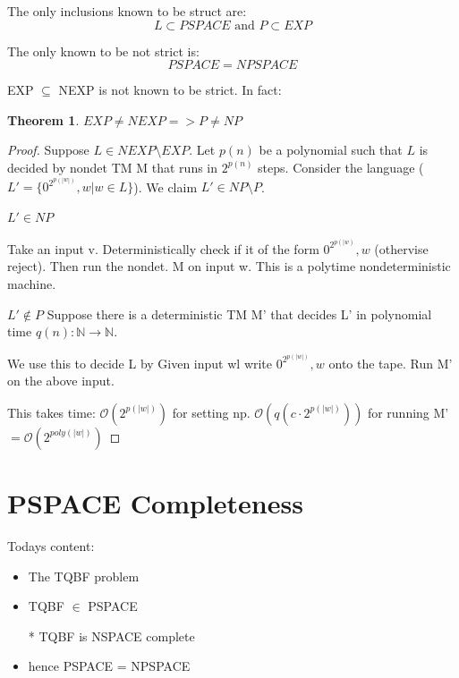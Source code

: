 \documentclass[a4paper,12pt]{article}
\theoremstyle{definition}
\newtheorem{theorem}[counter]{Theorem}
\theoremstyle{remark}
\newcommand{\N}{\mathbb{N}}
\begin{document}
The only inclusions known to be struct are:
\begin{equation*}
    L \subset PSPACE \text{ and } P \subset EXP
\end{equation*}

The only known to be not strict is:
\begin{equation*}
    PSPACE = NPSPACE
\end{equation*}

EXP $\subseteq$ NEXP is not known to be strict. In fact:

\begin{theorem}
    $EXP \neq NEXP => P \neq NP$
\end{theorem}

\begin{proof}
    Suppose $L \in NEXP \setminus EXP$. Let $p(n)$ be a polynomial such that $L$ is decided by nondet TM M that runs in $2^{p(n)}$ steps.
    Consider the language ($L' = \{0^{2^{p(|w|)}}, w | w \in L\}$). We claim $L' \in NP \setminus P$.
    
    $L' \in NP$
    
    Take an input v. Deterministically check if it of the form $0^{2^{p(|w)}}, w$ (othervise reject). Then run the nondet.
    M on input w. This is a polytime nondeterministic machine.
    
    $L' \notin P$
    Suppose there is a deterministic TM M' that decides L' in polynomial time $q(n): \N \to \N$.
    
    We use this to decide L by Given input wl write $0^{2^{p(|w|)}}, w$ onto the tape. Run M' on the above input.
    
    This takes time: $\mathscr{O}(2^{p(|w|)})$ for setting np. $\mathscr{O}(q(c\cdot2^{p(|w|)}))$ for running M'
    $= \mathscr{O}(2^{poly(|w|)})$
\end{proof}





\newpage
\section{PSPACE Completeness}
Todays content:
\begin{itemize}
    \item The TQBF problem
    \item TQBF $\in$ PSPACE
    \item[*] TQBF is NSPACE complete
    \item hence PSPACE = NPSPACE  
\end{itemize}
\end{document}
